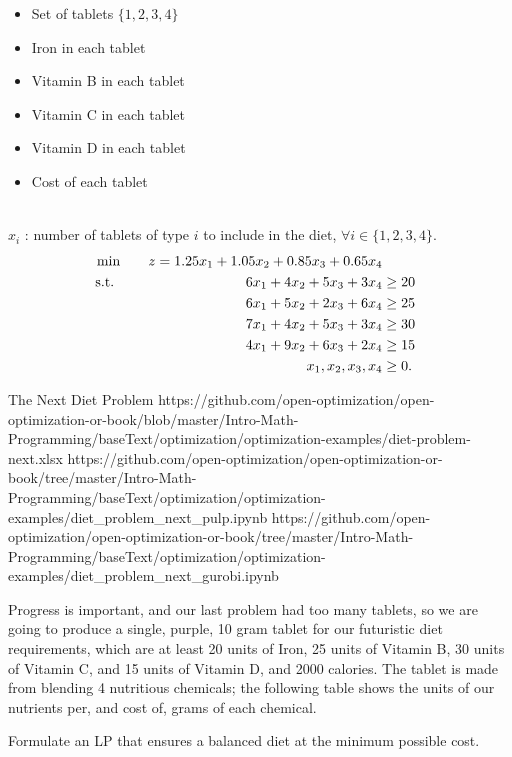 \begin{solution}
\smallskip {}
\begin{itemize}
\item Set of tablets $\{1,2,3,4\}$
\end{itemize}

\smallskip {}
\begin{itemize}
\item Iron in each tablet
\item Vitamin B in each tablet
\item Vitamin C in each tablet
\item Vitamin D in each tablet
\item Cost of each tablet
\end{itemize}

\smallskip  {} \\
$x_i$ : number of tablets of type $i$ to include in the diet, $\forall i \in \{1,2,3,4\}$.\\

\smallskip  {}
\begin{align*}
\min \quad && z = 1.25x_1 + 1.05x_2 + 0.85x_3 + 0.65x_4 \\
\text{ s.t. } \quad &&  6x_1 + 4x_2 + 5x_3 + 3x_4 &\ge 20  \\
&& 6x_1 + 5x_2 + 2x_3 + 6x_4 &\ge 25 \\
&& 7x_1 + 4x_2 + 5x_3 + 3x_4 &\ge 30 \\
&& 4x_1 + 9x_2 + 6x_3 + 2x_4 &\ge 15  \\
&& x_1, x_2, x_3, x_4 &\ge 0. 
\end{align*}
\end{solution}


\begin{examplewithallcode}{The Next Diet Problem}
{https://github.com/open-optimization/open-optimization-or-book/blob/master/Intro-Math-Programming/baseText/optimization/optimization-examples/diet-problem-next.xlsx}
{https://github.com/open-optimization/open-optimization-or-book/tree/master/Intro-Math-Programming/baseText/optimization/optimization-examples/diet_problem_next_pulp.ipynb}
{https://github.com/open-optimization/open-optimization-or-book/tree/master/Intro-Math-Programming/baseText/optimization/optimization-examples/diet_problem_next_gurobi.ipynb}

Progress is important, and our last problem had too many tablets, so we are going to produce a single, purple, 10 gram tablet for our futuristic diet requirements, which are at least 20 units of Iron, 25 units of Vitamin B, 30 units of Vitamin C, and 15 units of Vitamin D, and 2000 calories. The tablet is made from blending 4 nutritious chemicals; the following table shows the units of our nutrients per, and cost of, grams of each chemical.

Formulate an LP that ensures a balanced diet at the minimum possible cost.
\end{examplewithallcode}

